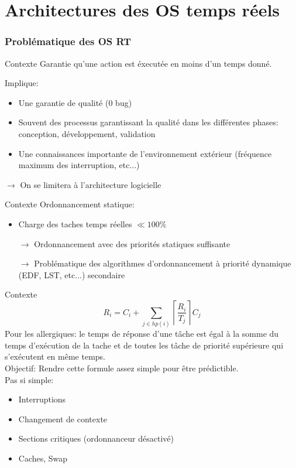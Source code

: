 \part{Architectures des OS temps réels}

\section{Problématique des OS RT} %

\begin{frame}{Contexte}
  Garantie qu'une action est éxecutée en moins d'un temps donné.

  Implique:
  \begin{itemize}
    \item Une garantie de qualité (0 bug)
    \item Souvent des processus garantissant la qualité dans les différentes phases: conception, développement, validation
    \item Une connaissances importante de l'environnement extérieur (fréquence maximum des interruption, etc...)
  \end{itemize}
  $\to$ On se limitera à l'architecture logicielle
\end{frame}

\begin{frame}{Contexte}
  Ordonnancement statique:
  \begin{itemize}
    \item Charge des taches temps réelles $\ll 100\%$
    \item[$\to$] Ordonnancement avec des priorités statiques suffisante
    \item[$\to$] Problématique des algorithmes d'ordonnancement à priorité dynamique (EDF, LST, etc...) secondaire
  \end{itemize}
\end{frame}

\begin{frame}{Contexte}
$$
R_i = C_i + \sum_{j \in hp(i)} \left\lceil\frac{R_i}{T_j}\right\rceil C_j
$$
Pour les allergiques: le temps de réponse d'une tâche est égal à la somme du
temps d'exécution de la tache et de toutes les tâche de priorité supérieure
qui s'exécutent en même temps.\\[1.5ex]
Objectif: Rendre cette formule assez simple pour être prédictible.\\[1.5ex]
Pas si simple:
  \begin{itemize}
    \item Interruptions
    \item Changement de contexte
    \item Sections critiques (ordonnanceur désactivé)
    \item Caches, Swap
  \end{itemize}
\end{frame}

